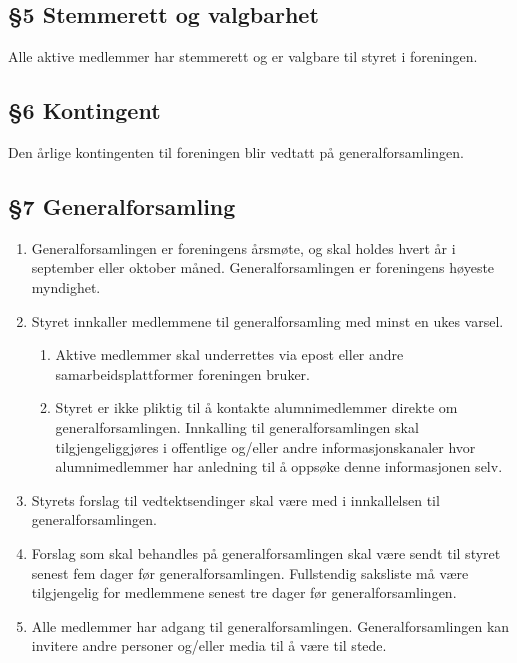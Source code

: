 \documentclass[a4paper,11pt,titlepage]{article}
\begin{document}
\subsection*{§5 Stemmerett og valgbarhet}
Alle aktive medlemmer har stemmerett og er valgbare til styret i foreningen.

\subsection*{§6 Kontingent}
Den årlige kontingenten til foreningen blir vedtatt på generalforsamlingen.

\subsection*{§7 Generalforsamling}
\begin{enumerate}
\item Generalforsamlingen er foreningens årsmøte, og skal holdes hvert år i september eller oktober måned. Generalforsamlingen er foreningens høyeste myndighet.

\item Styret innkaller medlemmene til generalforsamling med minst en ukes varsel. 

\begin{enumerate}
\item Aktive medlemmer skal underrettes via epost eller andre samarbeidsplattformer foreningen bruker. 
\item Styret er ikke pliktig til å kontakte alumnimedlemmer direkte om generalforsamlingen. Innkalling til generalforsamlingen skal tilgjengeliggjøres i offentlige og/eller andre informasjonskanaler hvor alumnimedlemmer har anledning til å oppsøke denne informasjonen selv. 
\end{enumerate}

\item Styrets forslag til vedtektsendinger skal være med i innkallelsen til generalforsamlingen.

\item Forslag som skal behandles på generalforsamlingen skal være sendt til styret senest fem dager før generalforsamlingen. Fullstendig saksliste må være tilgjengelig for medlemmene senest tre dager før generalforsamlingen.

\item Alle medlemmer har adgang til generalforsamlingen. Generalforsamlingen kan invitere andre personer og/eller media til å være til stede.


\end{enumerate}
\end{document}
